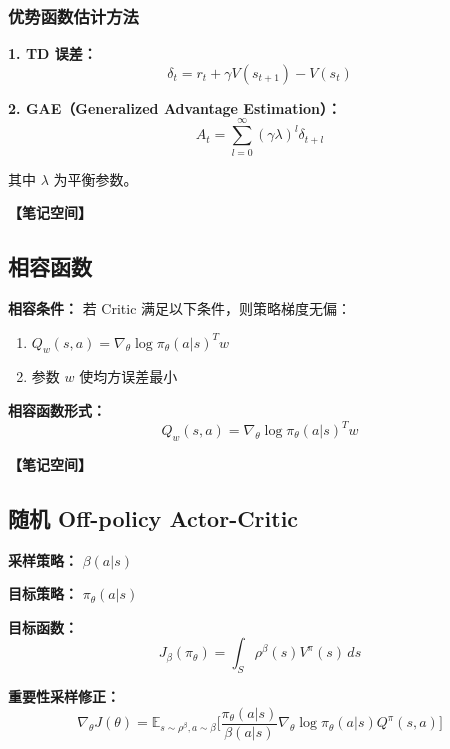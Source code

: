 \documentclass[12pt,a4paper]{article}
\newcommand{\notespace}[1][3cm]{%
  \vspace{#1}%
  \noindent\textbf{【笔记空间】}%
  \vspace{#1}%
}
\newcommand{\E}{\mathbb{E}}
\newcommand{\1}{\mathbf{1}}
\begin{document}
\subsubsection*{优势函数估计方法}

\textbf{1. TD 误差：}
\begin{equation}
\delta_t=r_t+\gamma V(s_{t+1})-V(s_t)
\end{equation}

\textbf{2. GAE（Generalized Advantage Estimation）：}
\begin{equation}
A_t=\sum_{l=0}^{\infty}(\gamma\lambda)^l\delta_{t+l}
\end{equation}

其中 $\lambda$ 为平衡参数。

\notespace[2cm]

\subsection{相容函数}

\begin{keybox}
\textbf{相容条件：} 若 Critic 满足以下条件，则策略梯度无偏：
\begin{enumerate}[leftmargin=1.5em]
  \item $Q_w(s,a)=\nabla_\theta\log\pi_\theta(a|s)^T w$
  \item 参数 $w$ 使均方误差最小
\end{enumerate}
\end{keybox}

\textbf{相容函数形式：}
\begin{equation}
Q_w(s,a)=\nabla_\theta\log\pi_\theta(a|s)^T w
\end{equation}

\notespace[2cm]

\subsection{随机 Off-policy Actor-Critic}

\textbf{采样策略：} $\beta(a|s)$

\textbf{目标策略：} $\pi_\theta(a|s)$

\textbf{目标函数：}
\begin{equation}
J_\beta(\pi_\theta)=\int_S\rho^\beta(s)V^\pi(s)\,ds
\end{equation}

\textbf{重要性采样修正：}
\begin{equation}
\nabla_\theta J(\theta)=\E_{s\sim\rho^\beta,a\sim\beta}\bigl[\frac{\pi_\theta(a|s)}{\beta(a|s)}\nabla_\theta\log\pi_\theta(a|s)Q^\pi(s,a)\bigr]
\end{equation}
\end{document}
